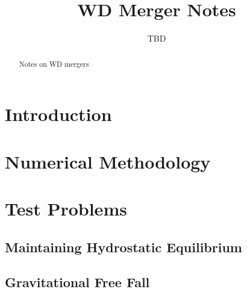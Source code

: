 \documentclass[12pt,preprint]{aastex}
\begin{document}
\title{WD Merger Notes}


\author{TBD}
\begin{abstract}
Notes on WD mergers
\end{abstract}

\section{Introduction}



\section{Numerical Methodology}\label{sec:Numerical Methodology}


\section{Test Problems}\label{Sec:Tests}

\subsection{Maintaining Hydrostatic Equilibrium}\label{Sec:HSE}

\subsection{Gravitational Free Fall}\label{Sec:Gravitational Free Fall}
\end{document}
